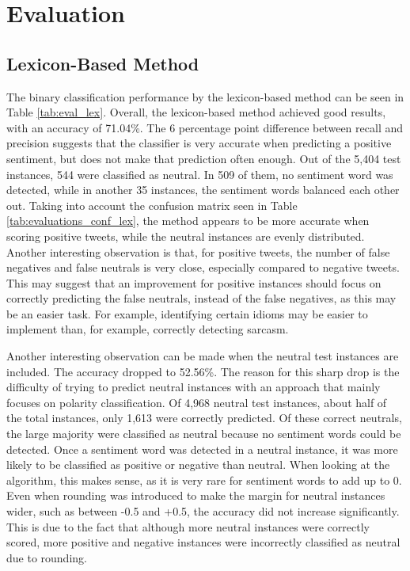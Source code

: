 \chapter{Evaluation}
\label{cha:Chapter6_Evaluation}
\section{Lexicon-Based Method}

The binary classification performance by the lexicon-based method can be seen in Table \ref{tab:eval_lex}. Overall, the lexicon-based method achieved good results, with an accuracy of 71.04\%. The 6 percentage point difference between recall and precision suggests that the classifier is very accurate when predicting a positive sentiment, but does not make that prediction often enough. Out of the 5,404 test instances, 544 were classified as neutral. In 509 of them, no sentiment word was detected, while in another 35 instances, the sentiment words balanced each other out. Taking into account the confusion matrix seen in Table \ref{tab:evaluations_conf_lex}, the method appears to be more accurate when scoring positive tweets, while the neutral instances are evenly distributed. Another interesting observation is that, for positive tweets, the number of false negatives and false neutrals is very close, especially compared to negative tweets. This may suggest that an improvement for positive instances should focus on correctly predicting the false neutrals, instead of the false negatives, as this may be an easier task. For example, identifying certain idioms may be easier to implement than, for example, correctly detecting sarcasm.

Another interesting observation can be made when the neutral test instances are included. The accuracy dropped to 52.56\%. The reason for this sharp drop is the difficulty of trying to predict neutral instances with an approach that mainly focuses on polarity classification. Of 4,968 neutral test instances, about half of the total instances, only 1,613 were correctly predicted. Of these correct neutrals, the large majority were classified as neutral because no sentiment words could be detected. Once a sentiment word was detected in a neutral instance, it was more likely to be classified as positive or negative than neutral. When looking at the algorithm, this makes sense, as it is very rare for sentiment words to add up to 0. Even when rounding was introduced to make the margin for neutral instances wider, such as between -0.5 and +0.5, the accuracy did not increase significantly. This is due to the fact that although more neutral instances were correctly scored, more positive and negative instances were incorrectly classified as neutral due to rounding.


